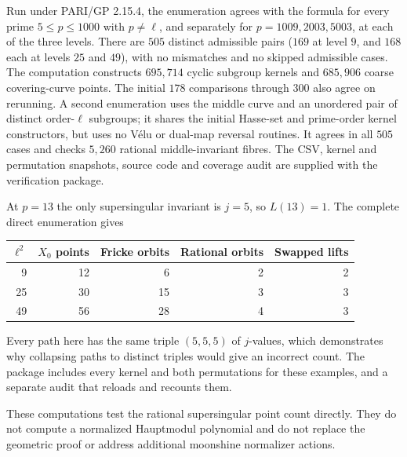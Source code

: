 Run under PARI/GP 2.15.4, the enumeration agrees with the formula for every
prime $5\leq p\leq1000$ with $p\ne\ell$, and separately for
$p=1009,2003,5003$, at each of the three levels. There are $505$ distinct
admissible pairs ($169$ at level $9$, and $168$ each at levels $25$ and $49$),
with no mismatches and no skipped admissible cases. The computation constructs
$695{,}714$ cyclic subgroup kernels and $685{,}906$ coarse covering-curve points.
The initial $178$ comparisons through $300$ also agree on rerunning.
A second enumeration uses the middle curve and an unordered pair of distinct
order-$\ell$ subgroups; it shares the initial Hasse-set and prime-order kernel
constructors, but uses no V\'elu or dual-map reversal routines. It agrees in all
$505$ cases and checks $5{,}260$ rational middle-invariant fibres.
The CSV, kernel and permutation snapshots, source code and coverage audit
are supplied with the verification package.

At $p=13$ the only supersingular invariant is $j=5$, so $L(13)=1$.
The complete direct enumeration gives
\begin{center}
\begin{tabular}{rrrrr}\toprule
$\ell^2$ & $X_0$ points & Fricke orbits & Rational orbits & Swapped lifts\\\midrule
9 & 12 & 6 & 2 & 2\\
25 & 30 & 15 & 3 & 3\\
49 & 56 & 28 & 4 & 3\\\bottomrule
\end{tabular}
\end{center}
Every path here has the same triple $(5,5,5)$ of $j$-values, which demonstrates
why collapsing paths to distinct triples would give an incorrect count.
The package includes every kernel and both permutations for these examples,
and a separate audit that reloads and recounts them.

These computations test the rational supersingular point count directly.
They do not compute a normalized Hauptmodul polynomial and do not replace the
geometric proof or address additional moonshine normalizer actions.
